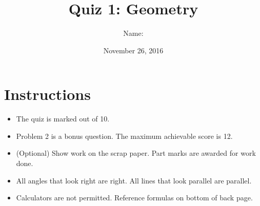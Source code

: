 \documentclass[12pt,letterpaper]{article}
\title{Quiz 1: Geometry}
\author{Name: \underline{\hspace{5cm}} \OutOf{10}}
\date{November 26, 2016}
\begin{document}
\newcommand*\circleletter[1]{%
  \begin{tikzpicture}[baseline=(C.base)]
    \node[draw,circle,inner sep=1pt](C) {#1};
  \end{tikzpicture}}

\maketitle

\thispagestyle{empty}

\section*{Instructions}
\begin{itemize}
  \item The quiz is marked out of 10.
  \item Problem 2 is a bonus question. The maximum achievable score is 12.
  \item (Optional) Show work on the scrap paper. Part marks are awarded for
  work done.
  \item All angles that look right are right. All lines that look parallel are
  parallel.
  \item Calculators are not permitted. Reference formulas on bottom of back
  page.
\end{itemize}
\end{document}
